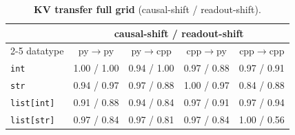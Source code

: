 \begin{table}[ht]\centering\small
\caption{\textbf{KV transfer full grid} (causal-shift / readout-shift).}
\label{tab:kv-grid}
\begin{tabular}{lcccc}
\toprule
& \multicolumn{4}{c}{causal-shift / readout-shift} \\
\cmidrule(lr){2-5}
datatype & py$\to$py & py$\to$cpp & cpp$\to$py & cpp$\to$cpp \\
\midrule
\texttt{int} & 1.00 / 1.00 & 0.94 / 1.00 & 0.97 / 0.88 & 0.97 / 0.91 \\
\texttt{str} & 0.94 / 0.97 & 0.97 / 0.88 & 1.00 / 0.97 & 0.84 / 0.88 \\
\texttt{list[int]} & 0.91 / 0.88 & 0.94 / 0.84 & 0.97 / 0.91 & 0.97 / 0.94 \\
\texttt{list[str]} & 0.97 / 0.84 & 0.97 / 0.81 & 0.97 / 0.84 & 1.00 / 0.56 \\
\bottomrule
\end{tabular}
\end{table}
